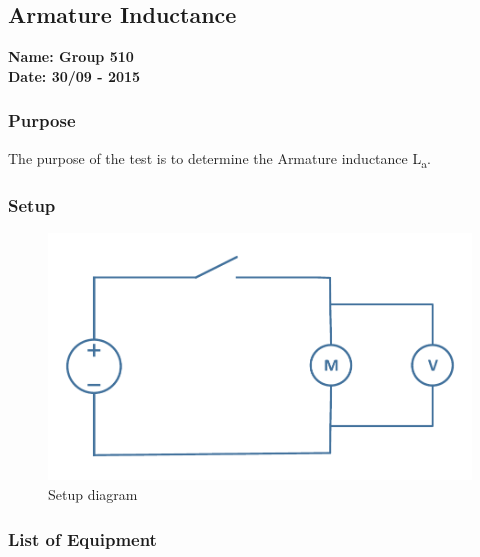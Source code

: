 \pagebreak
\subsection{Armature Inductance}%
\textbf{Name: Group 510}\\
\textbf{Date: 30/09 - 2015}

\subsubsection{Purpose}
The purpose of the test is to determine the Armature inductance \si{L_a}.

\subsubsection{Setup}
\begin{figure}[H]
  \centering
	\includegraphics[scale=0.5]{figures/MotorTest2.pdf}
	\caption{Setup diagram}
\end{figure}

\subsubsection{List of Equipment}

